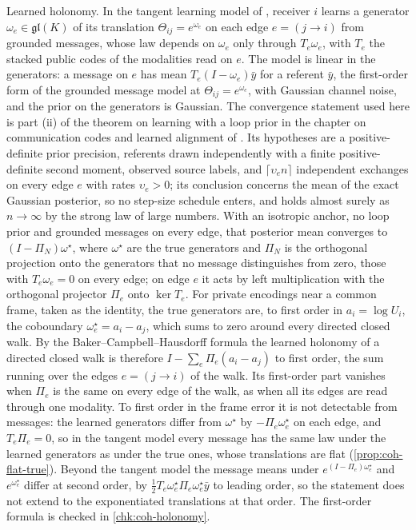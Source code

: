 Learned holonomy. In the tangent learning model of \citet{dennis2026magent}, receiver $i$ learns a generator $\omega_e\in\mathfrak{gl}(K)$ of its translation $\Theta_{ij}=e^{\omega_e}$ on each edge $e=(j\to i)$ from grounded messages, whose law depends on $\omega_e$ only through $T_e\omega_e$, with $T_e$ the stacked public codes of the modalities read on $e$. The model is linear in the generators: a message on $e$ has mean $T_e(I-\omega_e)\bar y$ for a referent $\bar y$, the first-order form of the grounded message model at $\Theta_{ij}=e^{\omega_e}$, with Gaussian channel noise, and the prior on the generators is Gaussian. The convergence statement used here is part (ii) of the theorem on learning with a loop prior in the chapter on communication codes and learned alignment of \citet{dennis2026magent}. Its hypotheses are a positive-definite prior precision, referents drawn independently with a finite positive-definite second moment, observed source labels, and $\lceil\upsilon_en\rceil$ independent exchanges on every edge $e$ with rates $\upsilon_e>0$; its conclusion concerns the mean of the exact Gaussian posterior, so no step-size schedule enters, and holds almost surely as $n\to\infty$ by the strong law of large numbers. With an isotropic anchor, no loop prior and grounded messages on every edge, that posterior mean converges to $(I-\Pi_N)\omega^\star$, where $\omega^\star$ are the true generators and $\Pi_N$ is the orthogonal projection onto the generators that no message distinguishes from zero, those with $T_e\omega_e=0$ on every edge; on edge $e$ it acts by left multiplication with the orthogonal projector $\Pi_e$ onto $\ker T_e$. For private encodings near a common frame, taken as the identity, the true generators are, to first order in $a_i=\log U_i$, the coboundary $\omega^\star_e=a_i-a_j$, which sums to zero around every directed closed walk. By the Baker--Campbell--Hausdorff formula the learned holonomy of a directed closed walk is therefore $I-\sum_e\Pi_e(a_i-a_j)$ to first order, the sum running over the edges $e=(j\to i)$ of the walk. Its first-order part vanishes when $\Pi_e$ is the same on every edge of the walk, as when all its edges are read through one modality. To first order in the frame error it is not detectable from messages: the learned generators differ from $\omega^\star$ by $-\Pi_e\omega^\star_e$ on each edge, and $T_e\Pi_e=0$, so in the tangent model every message has the same law under the learned generators as under the true ones, whose translations are flat (\cref{prop:coh-flat-true}). Beyond the tangent model the message means under $e^{(I-\Pi_e)\omega^\star_e}$ and $e^{\omega^\star_e}$ differ at second order, by $\frac12T_e\omega^\star_e\Pi_e\omega^\star_e\bar y$ to leading order, so the statement does not extend to the exponentiated translations at that order. The first-order formula is checked in \cref{chk:coh-holonomy}.

